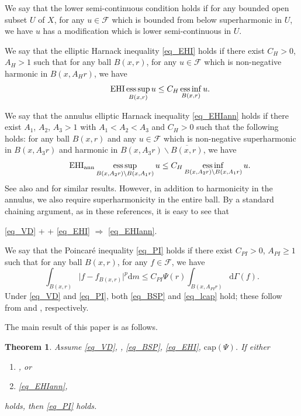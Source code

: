 \documentclass[10pt,a4paper]{amsart}
\numberwithin{equation}{section}
\newcommand{\esup}{\operatorname*{ess\,sup}}
\newcommand{\einf}{\operatorname*{ess\,inf}}
\newtheorem{theorem}{Theorem}[section]
\begin{document}
We say that the lower semi-continuous condition \hypertarget{eq_LSC}{} holds if for any bounded open subset $U$ of $X$, for any $u\in \mathcal{F}$ which is bounded from below superharmonic in $U$, we have $u$ has a modification which is lower semi-continuous in $U$.

We say that the elliptic Harnack inequality \ref{eq_EHI} holds if there exist $C_H>0$, $A_H>1$ such that for any ball $B(x,r)$, for any $u\in\mathcal{F}$ which is non-negative harmonic in $B(x,A_Hr)$, we have
\begin{equation*}\label{eq_EHI}\tag*{\text{EHI}}
\esup_{B(x,r)}u\le C_H\einf_{B(x,r)}u.
\end{equation*}

We say that the annulus elliptic Harnack inequality \ref{eq_EHIann} holds if there exist $A_1$, $A_2$, $A_3>1$ with $A_1<A_2<A_3$ and $C_H>0$ such that the following holds: for any ball $B(x,r)$ and any $u\in \mathcal{F}$ which is non-negative superharmonic in $B(x,A_3r)$ and harmonic in $B(x,A_3r)\backslash \overline{B(x,r)}$, we have
\begin{equation*}\label{eq_EHIann}\tag*{$\text{EHI}_{\text{ann}}$}
\esup_{B(x,A_2r)\backslash B(x,A_1r)}u\le C_H\einf_{B(x,A_2r)\backslash B(x,A_1r)}u.
\end{equation*}
See also \cite[Theorem 3.1]{Bla01} and \cite[LEMMA 6.3]{GS05} for similar results. However, in addition to harmonicity in the annulus, we also require superharmonicity in the entire ball. By a standard chaining argument, as in these references, it is easy to see that
\begin{center}
\ref{eq_VD} + \hyperlink{eq_LLC}{} + \ref{eq_EHI} $\Rightarrow$ \ref{eq_EHIann}.
\end{center}

We say that the Poincar\'e inequality \ref{eq_PI} holds if there exist $C_{PI}>0$, $A_{PI}\ge1$ such that for any ball $B(x,r)$, for any $f\in\mathcal{F}$, we have
\begin{equation*}\label{eq_PI}\tag*{PI($\Psi$)}
\int_{B(x,r)}\lvert f-f_{B(x,r)}\rvert^p\mathrm{d} m\le C_{PI}\Psi(r)\int_{{B(x,A_{PI}r)}}\mathrm{d}\Gamma(f).
\end{equation*}
Under \ref{eq_VD} and \ref{eq_PI}, both \ref{eq_BSP} and \ref{eq_lcap} hold; these follow from \cite[Lemma 4.1]{Yan25c} and \cite[Lemma 5.1 (a)]{BB04}, respectively.

The main result of this paper is as follows.

\begin{theorem}\label{thm_main}
Assume \ref{eq_VD}, \hyperlink{eq_LSC}{}, \ref{eq_BSP}, \ref{eq_EHI}, \hyperlink{eq_cap}{$\text{cap}(\Psi)$}. If either
\begin{enumerate}[label=(\alph*),ref=(\alph*)]
\item\label{cond_main_LLC} \hyperlink{eq_LLC}{}, or
\item\label{cond_main_EHIann} \ref{eq_EHIann},
\end{enumerate}
holds, then \ref{eq_PI} holds.
\end{theorem}
\end{document}
